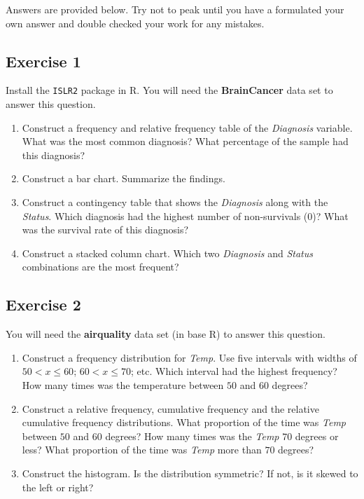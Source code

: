 \documentclass[
  letterpaper,
  DIV=11,
  numbers=noendperiod]{scrreprt}
\providecommand{\tightlist}{%
  \setlength{\itemsep}{0pt}\setlength{\parskip}{0pt}}\usepackage{longtable,booktabs,array}
\begin{document}
Answers are provided below. Try not to peak until you have a formulated
your own answer and double checked your work for any mistakes.

\hypertarget{exercise-1-2}{%
\subsection*{Exercise 1}\label{exercise-1-2}}

Install the \texttt{ISLR2} package in R. You will need the
\textbf{BrainCancer} data set to answer this question.

\begin{enumerate}
\def\labelenumi{\arabic{enumi}.}
\tightlist
\item
  Construct a frequency and relative frequency table of the
  \emph{Diagnosis} variable. What was the most common diagnosis? What
  percentage of the sample had this diagnosis?
\item
  Construct a bar chart. Summarize the findings.
\item
  Construct a contingency table that shows the \emph{Diagnosis} along
  with the \emph{Status}. Which diagnosis had the highest number of
  non-survivals (0)? What was the survival rate of this diagnosis?
\item
  Construct a stacked column chart. Which two \emph{Diagnosis} and
  \emph{Status} combinations are the most frequent?
\end{enumerate}

\hypertarget{exercise-2-2}{%
\subsection*{Exercise 2}\label{exercise-2-2}}

You will need the \textbf{airquality} data set (in base R) to answer
this question.

\begin{enumerate}
\def\labelenumi{\arabic{enumi}.}
\tightlist
\item
  Construct a frequency distribution for \emph{Temp}. Use five intervals
  with widths of \(50<x\le60\); \(60<x\le70\); etc. Which interval had
  the highest frequency? How many times was the temperature between
  \(50\) and \(60\) degrees?
\item
  Construct a relative frequency, cumulative frequency and the relative
  cumulative frequency distributions. What proportion of the time was
  \emph{Temp} between \(50\) and \(60\) degrees? How many times was the
  \emph{Temp} \(70\) degrees or less? What proportion of the time was
  \emph{Temp} more than \(70\) degrees?
\item
  Construct the histogram. Is the distribution symmetric? If not, is it
  skewed to the left or right?
\end{enumerate}
\end{document}
